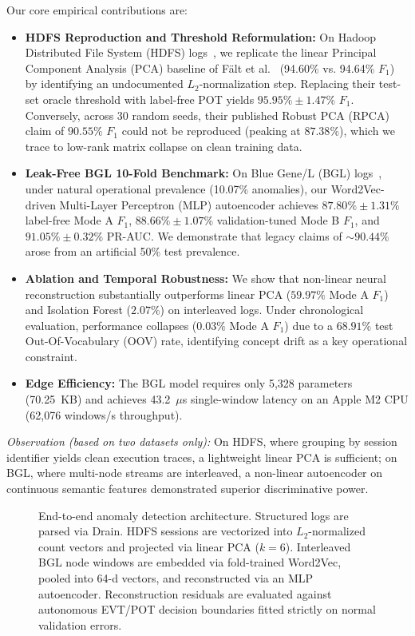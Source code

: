 \documentclass[conference]{IEEEtran}
\begin{document}
Our core empirical contributions are:
\begin{itemize}
    \item \textbf{HDFS Reproduction and Threshold Reformulation:} On Hadoop Distributed File System (HDFS) logs~\cite{xu2009detecting}, we replicate the linear Principal Component Analysis (PCA) baseline of F{\"a}lt et al.~\cite{falt2025lightweight} (94.60\% vs. 94.64\% $F_1$) by identifying an undocumented $L_2$-normalization step. Replacing their test-set oracle threshold with label-free POT yields $95.95\% \pm 1.47\%$ $F_1$. Conversely, across 30 random seeds, their published Robust PCA (RPCA) claim of $90.55\%$ $F_1$ could not be reproduced (peaking at $87.38\%$), which we trace to low-rank matrix collapse on clean training data.
    \item \textbf{Leak-Free BGL 10-Fold Benchmark:} On Blue Gene/L (BGL) logs~\cite{oliner2007supercomputer}, under natural operational prevalence (10.07\% anomalies), our Word2Vec-driven Multi-Layer Perceptron (MLP) autoencoder achieves $87.80\% \pm 1.31\%$ label-free Mode A $F_1$, $88.66\% \pm 1.07\%$ validation-tuned Mode B $F_1$, and $91.05\% \pm 0.32\%$ PR-AUC. We demonstrate that legacy claims of $\sim 90.44\%$ arose from an artificial 50\% test prevalence.
    \item \textbf{Ablation and Temporal Robustness:} We show that non-linear neural reconstruction substantially outperforms linear PCA ($59.97\%$ Mode A $F_1$) and Isolation Forest ($2.07\%$) on interleaved logs. Under chronological evaluation, performance collapses ($0.03\%$ Mode A $F_1$) due to a $68.91\%$ test Out-Of-Vocabulary (OOV) rate, identifying concept drift as a key operational constraint.
    \item \textbf{Edge Efficiency:} The BGL model requires only 5,328 parameters (70.25~KB) and achieves 43.2~$\mu$s single-window latency on an Apple M2 CPU (62,076 windows/s throughput).
\end{itemize}

\textit{Observation (based on two datasets only):} On HDFS, where grouping by session identifier yields clean execution traces, a lightweight linear PCA is sufficient; on BGL, where multi-node streams are interleaved, a non-linear autoencoder on continuous semantic features demonstrated superior discriminative power.

\begin{figure}[t]
\centering

\caption{End-to-end anomaly detection architecture. Structured logs are parsed via Drain. HDFS sessions are vectorized into $L_2$-normalized count vectors and projected via linear PCA ($k=6$). Interleaved BGL node windows are embedded via fold-trained Word2Vec, pooled into 64-d vectors, and reconstructed via an MLP autoencoder. Reconstruction residuals are evaluated against autonomous EVT/POT decision boundaries fitted strictly on normal validation errors.}
\label{fig:pipeline}
\end{figure}
\end{document}

